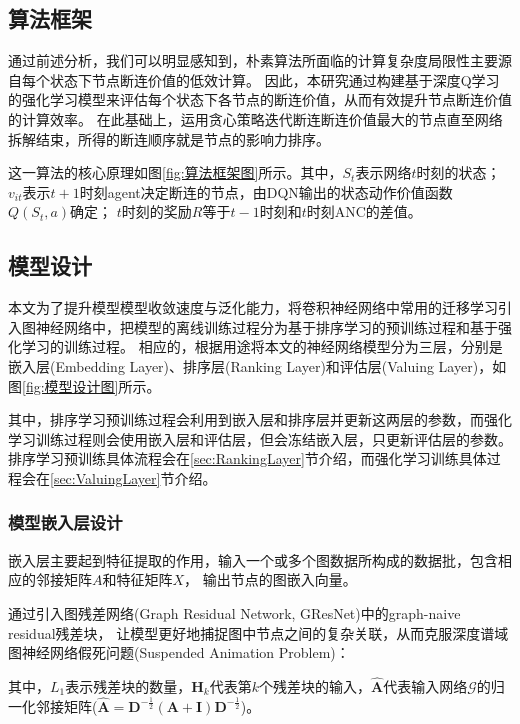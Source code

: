 \documentclass[twocolumn]{morningstar}
\begin{document}
\subsection{算法框架}\label{sec:AlgorithmFramework}



通过前述分析，我们可以明显感知到，朴素算法所面临的计算复杂度局限性主要源自每个状态下节点断连价值的低效计算。
因此，本研究通过构建基于深度Q学习的强化学习模型来评估每个状态下各节点的断连价值，从而有效提升节点断连价值的计算效率。
在此基础上，运用贪心策略迭代断连断连价值最大的节点直至网络拆解结束，所得的断连顺序就是节点的影响力排序。

这一算法的核心原理如图\ref{fig:算法框架图}所示。其中，$S_t$表示网络$t$时刻的状态；
$v_{it}$表示$t+1$时刻agent决定断连的节点，由DQN输出的状态动作价值函数$Q(S_t, a)$确定；
$t$时刻的奖励$R$等于$t-1$时刻和$t$时刻ANC的差值。


\subsection{模型设计}\label{sec:ModelDesign}

本文为了提升模型模型收敛速度与泛化能力，将卷积神经网络中常用的迁移学习引入图神经网络中，把模型的离线训练过程分为基于排序学习的预训练过程和基于强化学习的训练过程。
相应的，根据用途将本文的神经网络模型分为三层，分别是嵌入层(Embedding Layer)、排序层(Ranking Layer)和评估层(Valuing Layer)，如图\ref{fig:模型设计图}所示。

% 


其中，排序学习预训练过程会利用到嵌入层和排序层并更新这两层的参数，而强化学习训练过程则会使用嵌入层和评估层，但会冻结嵌入层，只更新评估层的参数。
排序学习预训练具体流程会在\ref{sec:RankingLayer}节介绍，而强化学习训练具体过程会在\ref{sec:ValuingLayer}节介绍。


\subsubsection{模型嵌入层设计}\label{sec:EmbeddingLayer}

% 

嵌入层主要起到特征提取的作用，输入一个或多个图数据所构成的数据批，包含相应的邻接矩阵$A$和特征矩阵$X$，
输出节点的图嵌入向量。

通过引入图残差网络\cite{zhang2019GResNet}(Graph Residual Network, GResNet)中的graph-naive residual残差块，
让模型更好地捕捉图中节点之间的复杂关联，从而克服深度谱域图神经网络假死问题(Suspended Animation Problem)：

\noindent 其中，$L_1$表示残差块的数量，$\mathbf{H}_{k}$代表第$k$个残差块的输入，$\hat{\mathbf{A}}$代表输入网络$\mathcal{G}$的归一化邻接矩阵($\hat{\mathbf{A}} = \mathbf{D}^{-\frac{1}{2}}(\mathbf{A}+\mathbf{I}) \mathbf{D}^{-\frac{1}{2}}$)。
\end{document}
